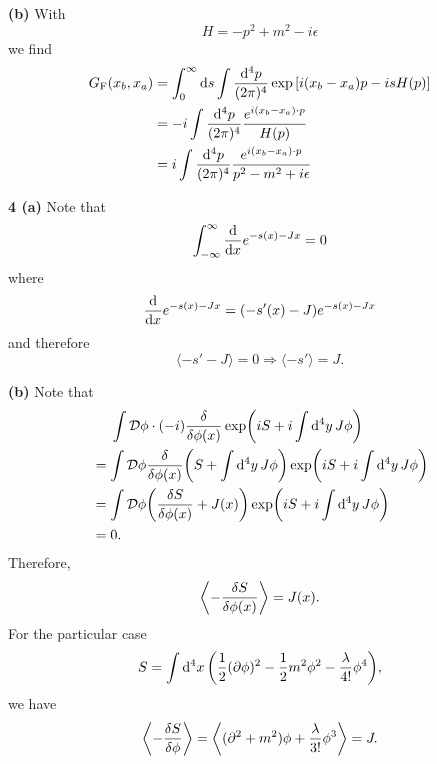 \documentclass{article}
\makeatletter
\newcommand*{\shifttext}[1]{%
  \settowidth{\@tempdima}{#1}%
  \hspace{-\@tempdima}#1%
}
\newcommand{\plabel}[1]{%
\shifttext{\textbf{#1}\quad}%
}
\newcommand{\prule}{%
\begin{center}%
\hdashrule[0.5ex]{.99\linewidth}{1pt}{1pt 2.5pt}%
\end{center}%
}
\makeatother
\begin{document}
\plabel{(b)}%
With
\[ H = -p^2 + m^2 - i\epsilon \]
we find
\begin{align*}
    G_{\mathrm{F}}(x_b,x_a) &= \int_0^\infty \dd{s} \int \frac{\dd[4]{p}}{(2\pi)^4} \exp\qty[i(x_b - x_a)p - i s H(p)] \\
    &= -i \int \frac{\dd[4]{p}}{(2\pi)^4} \frac{e^{i(x_b-x_a)\cdot p}}{H(p)} \\
    &= i \int \frac{\dd[4]{p}}{(2\pi)^4} \frac{e^{i(x_b-x_a)\cdot p}}{p^2 - m^2 + i\epsilon} \\
\end{align*}

\prule

\plabel{4 (a)}%
Note that
\[ \int_{-\infty}^\infty \dv{}{x} e^{-s(x) - J x} = 0 \]
where
\[ \dv{}{x} e^{-s(x) - J x} = (-s'(x) - J) e^{-s(x) - J x} \]
and therefore
\[ \langle -s' - J \rangle = 0 \Rightarrow \langle -s' \rangle = J. \]

\plabel{(b)}%
Note that
\begin{align*}
    &\phantom{{}={}} \int \mathcal{D}{\phi} \cdot (-i) \fdv{}{\phi(x)} \exp(iS + i\int \dd[4]{y} J\phi) \\
    &= \int \mathcal{D}\phi \fdv{\phi(x)}(S + \int \dd[4]{y} J\phi) \exp(iS + i\int \dd[4]{y} J\phi) \\
    &= \int \mathcal{D}\phi \qty(\fdv{S}{\phi(x)} + J(x)) \exp(iS + i\int \dd[4]{y} J\phi) \\
    &= 0.
\end{align*}
Therefore,
\[ \ev{-\fdv{S}{\phi(x)}} = J(x). \]
For the particular case
\[ S = \int \dd[4]{x} \qty(\frac{1}{2}(\partial \phi)^2 - \frac{1}{2}m^2\phi^2 - \frac{\lambda}{4!}\phi^4), \]
we have
\[ \ev{-\fdv{S}{\phi}} = \ev{(\partial^2 + m^2)\phi + \frac{\lambda}{3!}\phi^3} = J. \]
\end{document}
